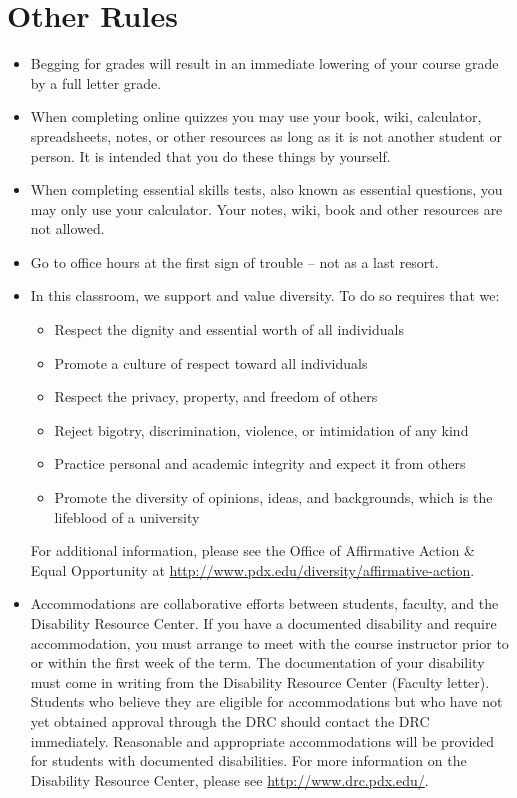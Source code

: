 \documentclass[letterpaper,10pt]{article}
\begin{document}
\section{Other Rules}
\begin{itemize}


\item Begging for grades will result in an immediate lowering of your
  course grade by a full letter grade.
  
  \item When completing online quizzes you may use your book, wiki, calculator, spreadsheets, notes, or other resources as long as it is not another student or person.  It is intended that you do these things by yourself.
  
  
   \item When completing essential skills tests, also known as essential questions, you may only use your calculator.  Your notes, wiki, book and other resources are not allowed.

\item Go to office hours at the first sign of trouble -- not as a last
  resort.

\item In this classroom, we support and value diversity.  To do so requires that we:
\begin{itemize}
   \item Respect the dignity and essential worth of all individuals
   \item Promote a culture of respect toward all individuals
    \item Respect the privacy, property, and freedom of others
    \item Reject bigotry, discrimination, violence, or intimidation of any kind
    \item Practice personal and academic integrity and expect it from others
   \item Promote the diversity of opinions, ideas, and backgrounds, which is
    the lifeblood of a university
\end{itemize}

 For additional information, please see the Office of Affirmative Action \& Equal Opportunity at \url{http://www.pdx.edu/diversity/affirmative-action}.


\item Accommodations are collaborative efforts between students, faculty, and the Disability Resource Center.  If you have a documented disability and require accommodation, you must arrange to meet with the course instructor prior to or within the first week of the term.  The documentation of your disability must come in writing from the Disability Resource Center (Faculty letter).  Students who believe they are eligible for accommodations but who have not yet obtained approval through the DRC should contact the DRC immediately.  Reasonable and appropriate accommodations will be provided for students with documented disabilities.  For more information on the Disability Resource Center, please see \url{http://www.drc.pdx.edu/}. 


\end{itemize}
\end{document}
